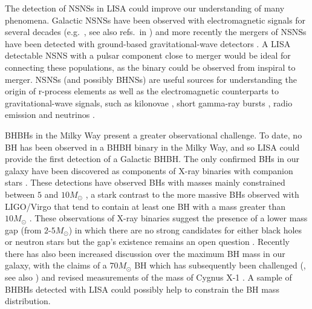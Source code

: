 The detection of NSNSs in LISA could improve our understanding of many phenomena. Galactic NSNSs have been observed with electromagnetic signals for several decades (e.g.\ \citealp{Hulse+1975, Antoniadis+2016}, see also refs.\ in \citealp{Tauris+2017}) and more recently the mergers of NSNSs have been detected with ground-based gravitational-wave detectors \citep[e.g.][]{Abbott+2017_NSNS}. A LISA detectable NSNS with a pulsar component close to merger would be ideal for connecting these populations, as the binary could be observed from inspiral to merger. NSNSs (and possibly BHNSs) are useful sources for understanding the origin of r-process elements \citep[e.g.][]{Eichler+1989} as well as the electromagnetic counterparts to gravitational-wave signals, such as kilonovae \citep[e.g.][]{Li+1998, Metzger+2017}, short gamma-ray bursts \citep[e.g.][]{Berger+2014}, radio emission \citep[e.g.][]{Hotokezaka+2016} and neutrinos \citep[e.g.][]{Kyutoku+2018}.

BHBHs in the Milky Way present a greater observational challenge. To date, no BH has been observed in a BHBH binary in the Milky Way, and so LISA could provide the first detection of a Galactic BHBH. The only confirmed BHs in our galaxy have been discovered as components of X-ray binaries with companion stars \citep[e.g.][]{Bolton+1972,Webster+1972}. These detections have observed BHs with masses mainly constrained between $5$ and $10 \unit{M_\odot}$ \citep{Corral-Santana+2016}, a stark contrast to the more massive BHs observed with LIGO/Virgo that tend to contain at least one BH with a mass greater than $10 \unit{M_{\odot}}$ \citep{Abbott+2020_GWTC2}. These observations of X-ray binaries suggest the presence of a lower mass gap (from $2$-$5 \unit{M_{\odot}}$) in which there are no strong candidates for either black holes or neutron stars \citep{Ozel+2010,Farr+2011} but the gap's existence remains an open question \citep[e.g.][]{Kreidberg+2012, Mandel+2020}. Recently there has also been increased discussion over the maximum BH mass in our galaxy, with the claims of a $70 \unit{M_{\odot}}$ BH \citep{Liu+2019} which has subsequently been challenged (\citealp{El-Badry+2020, Abdul-Masih+2020, Shenar+2020,Eldridge+2020}, see also \citealp{Liu+2020}) and revised measurements of the mass of Cygnus X-1 \citep{Miller-Jones+2021}. A sample of BHBHs detected with LISA could possibly help to constrain the BH mass distribution.

